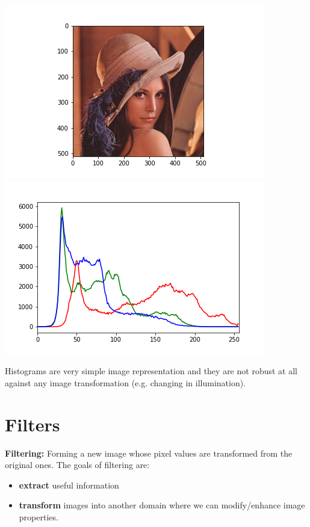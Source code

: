 \begin{flushleft}
    \includegraphics[scale=0.5]{images/lena RGB.png}
    \includegraphics[scale=0.5]{images/histrogram RGB.png}
\end{flushleft}
Histograms are very simple image representation and they are not robust at all against any image transformation (e.g. changing in illumination).

\section{Filters}
\textbf{Filtering:} Forming a new image whose pixel values are transformed from the original ones.\newline
The goals of filtering are:
\begin{itemize}
    \item \textbf{extract} useful information
    \item \textbf{transform} images into another domain where we can modify/enhance image properties.
\end{itemize}
